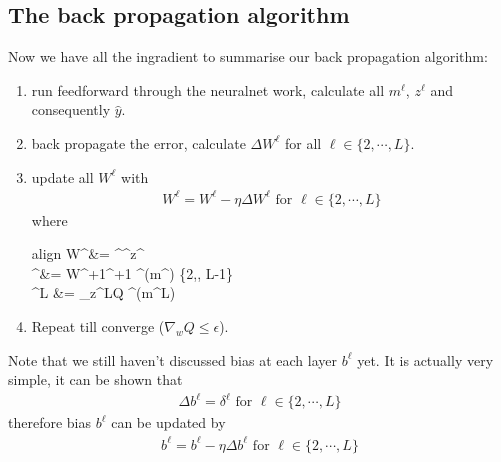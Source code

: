 \documentclass{article} [10pt] %
\begin{document}
\subsection{The back propagation algorithm}
Now we have all the ingradient to summarise our back propagation algorithm:
\begin{enumerate}
	\item run feedforward through the neuralnet work, calculate all $m^\ell$, $z^\ell$ and consequently $\hat{y}$.
	\item back propagate the error, calculate $\Delta W^\ell$ for all $\ell \in \{2, \cdots, L\}$.
	\item update all $W^\ell$ with 
	\begin{align}
		\boxed{W^\ell = W^\ell - \eta\Delta W^\ell \text{ for } \ell \in \{2, \cdots, L\}}
	\end{align}
	where 
	\begin{empheq}[box=\fbox]{align}
		\Delta W^\ell &= {\delta^{\ell}}^\top z^{} \\
		\delta^\ell &= W^{\ell+1}{\delta^{\ell+1}} \odot {\sigma^{\ell}}^\prime(m^{\ell})  \ell \in \{2,\cdots, L-1\}\\
		\delta^L &= \nabla_{z^L}Q ^\prime(m^L)
	\end{empheq}
	\item Repeat till converge ($\nabla_wQ \leq \epsilon$).
\end{enumerate}
Note that we still haven't discussed bias at each layer $b^\ell$ yet. It is actually very simple, it can be shown that 
\begin{align}
	\boxed{\Delta b^\ell = \delta^\ell \text{ for } \ell \in \{2, \cdots, L\}}
\end{align}
therefore bias $b^\ell$ can be updated by 
\begin{align}
	\boxed{b^\ell = b^\ell - \eta\Delta b^\ell \text{ for } \ell \in \{2, \cdots, L\}}
\end{align}
\end{document}
